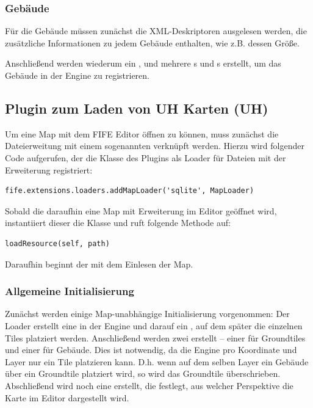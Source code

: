 \subsubsection{Gebäude}
Für die Gebäude müssen zunächst die XML-Deskriptoren ausgelesen werden, die
zusätzliche Informationen zu jedem Gebäude enthalten, wie z.B. dessen Größe.

Anschließend werden wiederum ein ,  und
mehrere s und s erstellt, um das Gebäude in
der Engine zu registrieren.


\subsection{Plugin zum Laden von UH Karten (UH)}
Um eine Map mit dem FIFE Editor öffnen zu können, muss zunächst die
Dateierweitung mit einem sogenannten  verknüpft werden.
Hierzu wird folgender Code
aufgerufen, der die Klasse  des  Plugins
als Loader für Dateien mit der Erweiterung  registriert:

\begin{lstlisting}
fife.extensions.loaders.addMapLoader('sqlite', MapLoader)
\end{lstlisting}

Sobald die daraufhin eine Map mit  Erweiterung im Editor geöffnet
wird, instantiiert dieser die  Klasse und ruft folgende Methode
auf:

\begin{lstlisting}
loadResource(self, path)
\end{lstlisting}

Daraufhin beginnt der  mit dem Einlesen der Map.

\subsubsection{Allgemeine Initialisierung}
Zunächst werden einige Map-unabhängige Initialisierung vorgenommen:
Der Loader erstellt eine  in der Engine und darauf ein
, auf dem später die einzelnen Tiles platziert werden.
Anschließend werden zwei  erstellt -- einer für Groundtiles
und einer für Gebäude. Dies ist notwendig, da die Engine pro Koordinate
und Layer nur ein Tile platzieren kann. D.h. wenn auf dem selben Layer
ein Gebäude über ein Groundtile platziert wird, so wird das Groundtile
überschrieben.
Abschließend wird noch eine  erstellt, die festlegt, aus
welcher Perspektive die Karte im Editor dargestellt wird.

